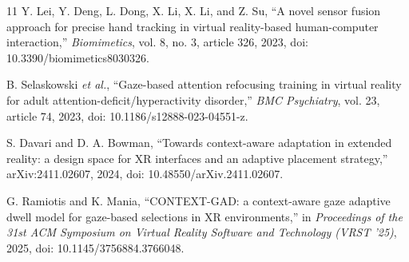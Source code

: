 \documentclass[conference]{IEEEtran}
\begin{document}
\begin{thebibliography}{11}
Y. Lei, Y. Deng, L. Dong, X. Li, X. Li, and Z. Su, ``A novel sensor fusion approach for precise hand tracking in virtual reality-based human-computer interaction,'' \emph{Biomimetics}, vol. 8, no. 3, article 326, 2023, doi: 10.3390/biomimetics8030326.

B. Selaskowski \emph{et al.}, ``Gaze-based attention refocusing training in virtual reality for adult attention-deficit/hyperactivity disorder,'' \emph{BMC Psychiatry}, vol. 23, article 74, 2023, doi: 10.1186/s12888-023-04551-z.

S. Davari and D. A. Bowman, ``Towards context-aware adaptation in extended reality: a design space for XR interfaces and an adaptive placement strategy,'' arXiv:2411.02607, 2024, doi: 10.48550/arXiv.2411.02607.

G. Ramiotis and K. Mania, ``CONTEXT-GAD: a context-aware gaze adaptive dwell model for gaze-based selections in XR environments,'' in \emph{Proceedings of the 31st ACM Symposium on Virtual Reality Software and Technology (VRST '25)}, 2025, doi: 10.1145/3756884.3766048.

\end{thebibliography}
\end{document}
